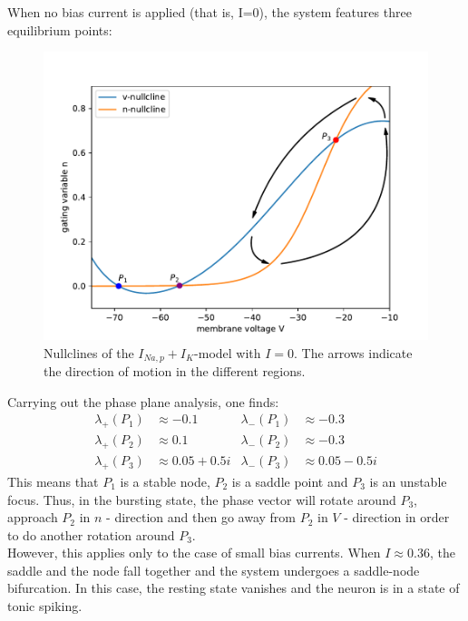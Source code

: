 \documentclass[12pt,a4paper]{article}
\begin{document}
When no bias current is applied (that is, I=0), the system features three equilibrium points:
\begin{figure}[H]
	\centering
	\includegraphics[scale=0.5]{inapikrealncwnp.pdf}\caption{Nullclines of the $I_{Na,p}+I_K$-model with $I=0$. The arrows indicate the direction of motion in the different regions.}
	\label{realnc}
\end{figure}
Carrying out the phase plane analysis, one finds:
\begin{align*}
\lambda_+(P_1)&\approx-0.1 & \lambda_-(P_1)&\approx-0.3\\
\lambda_+(P_2)&\approx 0.1& \lambda_-(P_2)&\approx -0.3\\
\lambda_+(P_3)&\approx 0.05 + 0.5i& \lambda_-(P_3)&\approx 0.05 - 0.5i
\end{align*}
This means that $P_1$ is a stable node, $P_2$ is a saddle point and $P_3$ is an unstable focus. Thus, in the bursting state, the phase vector will rotate around $P_3$, approach $P_2$ in $n$ - direction and then go away from $P_2$ in $V$ - direction in order to do another rotation around $P_3$.\\
However, this applies only to the case of small bias currents. When $I\approx 0.36$, the saddle and the node fall together and the system undergoes a saddle-node bifurcation. In this case, the resting state vanishes and the neuron is in a state of tonic spiking.
\end{document}
